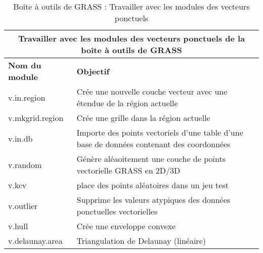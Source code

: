 \begin{table}[ht]
\centering
\caption{Bo\^ite \`a outils de GRASS : Travailler avec les modules des vecteurs ponctuels}\medskip
 \begin{tabular}{|p{4cm}|p{12cm}|}
\hline \multicolumn{2}{|c|}{\textbf{Travailler avec les modules des vecteurs ponctuels de la bo\^ite \`a outils de GRASS}} \\
  \hline \textbf{Nom du module} & \textbf{Objectif} \\
  \hline v.in.region & Cr\'ee une nouvelle couche vecteur avec une \'etendue de la r\'egion actuelle\\
  \hline v.mkgrid.region & Cr\'ee une grille dans la r\'egion actuelle\\
  \hline v.in.db & Importe des points vectoriels d'une table d'une base de donn\'ees contenant des coordonn\'ees\\
  \hline v.random & G\'en\`ere al\'eaoitement une couche de points vectorielle GRASS en 2D/3D\\
  \hline v.kcv & place des points al\'eatoires dans un jeu test\\
  \hline v.outlier & Supprime les valeurs atypiques des donn\'ees ponctuelles vectorielles\\
  \hline v.hull & Cr\'ee une enveloppe convexe\\
  \hline v.delaunay.area & Triangulation de Delaunay (lin\'eaire) \\

\end{tabular}
\end{table}
